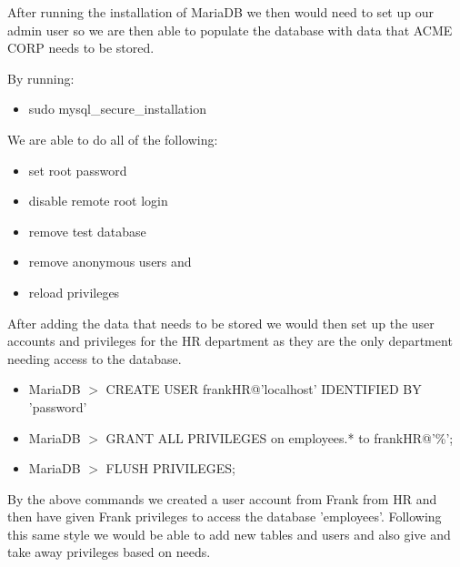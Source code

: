 \noindent After running the installation of MariaDB we then would need to set up our admin user so we are then able to populate the database with data that ACME CORP needs to be stored. 

\noindent By running:

\begin{itemize}
\item sudo mysql\_secure\_installation \\
\end{itemize}

\noindent We are able to do all of the following: 

\begin{itemize}
\item set root password
\item disable remote root login
\item remove test database
\item remove anonymous users and
\item reload privileges
\end{itemize}

\noindent After adding the data that needs to be stored we would then set up the user accounts and privileges for the HR department as they are the only department needing access to the database.

\begin{itemize}

\item MariaDB $>$ CREATE USER frankHR@'localhost' IDENTIFIED BY 'password'

\item MariaDB $>$ GRANT ALL PRIVILEGES on employees.* to frankHR@'\%';

\item MariaDB $>$ FLUSH PRIVILEGES; 

\end{itemize}

\noindent By the above commands we created a user account from Frank from HR and then have given Frank privileges to access the database 'employees'. Following this same style we would be able to add new tables and users and also give and take away privileges based on needs.



